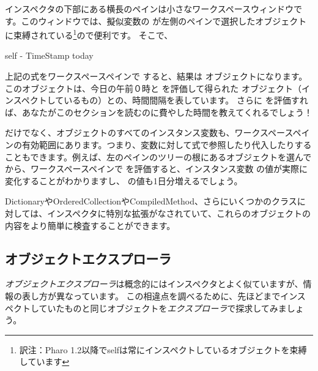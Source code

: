 \documentclass[a4paper,10pt,twoside]{book}
\begin{document}
インスペクタの下部にある横長のペインは小さなワークスペースウィンドウです。このウィンドウでは、擬似変数の  が左側のペインで選択したオブジェクトに束縛されている\footnote{訳注：Pharo 1.2以降でselfは常にインスペクトしているオブジェクトを束縛しています}ので便利です。
そこで、
\begin{code}{}
self - TimeStamp today
\end{code}
上記の式をワークスペースペインで  すると、結果は  オブジェクトになります。このオブジェクトは、今日の午前０時と  を評価して得られた  オブジェクト（インスペクトしているもの）との、時間間隔を表しています。
さらに  を評価すれば、あなたがこのセクションを読むのに費やした時間を教えてくれるでしょう！

 だけでなく、オブジェクトのすべてのインスタンス変数も、ワークスペースペインの有効範囲にあります。つまり、変数に対して式で参照したり代入したりすることもできます。例えば、左のペインのツリーの根にあるオブジェクトを選んでから、ワークスペースペインで  を評価すると、インスタンス変数  の値が実際に変化することがわかりますし、 の値も1日分増えるでしょう。


DictionaryやOrderedCollectionやCompiledMethod、さらにいくつかのクラスに対しては、インスペクタに特別な拡張がなされていて、これらのオブジェクトの内容をより簡単に検査することができます。

\subsection{オブジェクトエクスプローラ}

\emph{オブジェクトエクスプローラ}は概念的にはインスペクタとよく似ていますが、情報の表し方が異なっています。
この相違点を調べるために、先ほどまでインスペクトしていたものと同じオブジェクトを\emph{エクスプローラ}で探求してみましょう。
\end{document}
